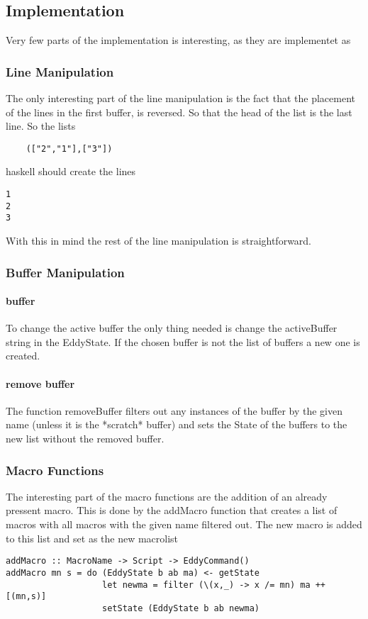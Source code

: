 \documentclass{article}
\begin{document}
\subsection{Implementation}

Very few parts of the implementation is interesting, as they are 
implementet as 

\subsubsection{Line Manipulation}

The only interesting part of the line manipulation is the fact
that the placement of the lines in the first buffer, is reversed.
So that the head of the list is the last line. So the lists
\begin{verbatim}
    (["2","1"],["3"])
\end{verbatim}{haskell}
should create the lines
\begin{verbatim}
1
2
3
\end{verbatim}
With this in mind the rest of the line manipulation is straightforward.

\subsubsection{Buffer Manipulation}
\paragraph {buffer}
To change the active buffer the only thing needed is change the
activeBuffer string in the EddyState.
If the chosen buffer is not the list of buffers a new one is created.
\paragraph {remove buffer}
The function removeBuffer filters out any instances of the buffer by the given
name (unless it is the *scratch* buffer) and sets the State of the buffers to the
new list without the removed buffer.

\subsubsection{Macro Functions}
The interesting part of the macro functions are the addition of an
already pressent macro.
This is done by the addMacro function that creates a list of macros
with all macros with the given name filtered out. The new macro
is added to this list and set as the new macrolist
\begin{verbatim}
addMacro :: MacroName -> Script -> EddyCommand()
addMacro mn s = do (EddyState b ab ma) <- getState
                   let newma = filter (\(x,_) -> x /= mn) ma ++ [(mn,s)]
                   setState (EddyState b ab newma)
\end{verbatim}
\end{document}
